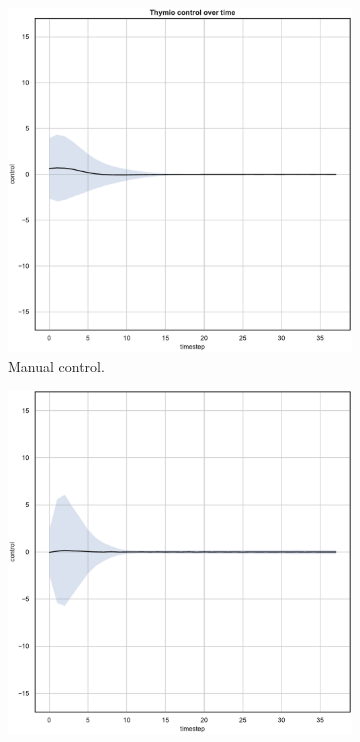 \begin{figure}\ContinuedFloat
	\begin{center}
		\begin{subfigure}[h]{0.35\textwidth}			
			\includegraphics[width=\textwidth]{contents/images/net-d1/control-overtime-manual}%
			\caption{Manual control.}
		\end{subfigure}
		\hspace{1cm}
		\begin{subfigure}[h]{0.35\textwidth}
			\includegraphics[width=\textwidth]{contents/images/net-c1/control-overtime-learned_communication}

\end{subfigure}
\end{center}
\end{figure}
